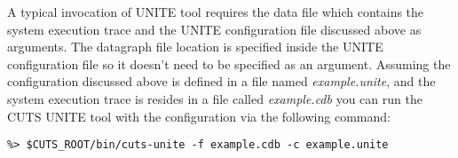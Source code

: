 A typical invocation of UNITE tool requires the data file which 
contains the system execution trace and the UNITE configuration 
file discussed above as arguments. The datagraph file location 
is specified inside the UNITE configuration file so it doesn't 
need to be specified as an argument. 
Assuming the configuration discussed above is defined in a file 
named \textit{example.unite},  and the system execution trace is resides 
in a file called \textit{example.cdb} you can run the CUTS UNITE tool with
the configuration via the following command: 
\begin{lstlisting}
%> $CUTS_ROOT/bin/cuts-unite -f example.cdb -c example.unite
\end{lstlisting}